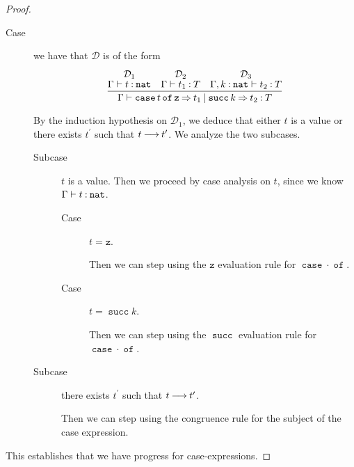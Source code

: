 \documentclass[11pt,letterpaper]{article}
\renewcommand{\succ}{\operatorname{\mathtt{succ}}}
\newcommand{\nat}{\mathtt{nat}}
\newcommand{\case}[1]{\operatorname{\mathtt{case}}#1\operatorname{\mathtt{of}}}
\begin{document}
\begin{enumerate}
\begin{proof}
      \begin{description}
        \item[Case] we have that $\mathcal{D}$ is of the form
          \begin{equation*}
            \infer{%
              \Gamma
              \proves
              \case{t} \mathtt{z} \goesto t_1
              \orcase \succ k \goesto t_2
              \hastype
              T
            }{
              \deduce[\mathcal{D}_1]{\Gamma \proves t \hastype \nat}{}
              &
              \deduce[\mathcal{D}_2]{\Gamma \proves t_1 \hastype T}{}
              &
              \deduce[\mathcal{D}_3]{
                \Gamma, k\hastype \nat \proves t_2 \hastype T
              }{}
            }
          \end{equation*}

          By the induction hypothesis on $\mathcal{D}_1$,
          we deduce that either $t$ is a value or there exists $t^\prime$ such
          that $t \mathbin{\longrightarrow} t^\prime$.
          We analyze the two subcases.
          \begin{description}
            \item[Subcase] $t$ is a value.
              Then we proceed by case analysis on $t$,
              since we know $\Gamma \proves t \hastype \nat$.
              \begin{description}
                \item[Case] $t = \mathtt{z}$.

                  Then we can step using the $\mathtt{z}$ evaluation rule for
                  $\case{\cdot}$.

                \item[Case] $t = \succ k$.

                  Then we can step using the $\succ$ evaluation rule for
                  $\case{\cdot}$.
              \end{description}

            \item[Subcase]
              there exists $t^\prime$ such that $t \mathbin{\longrightarrow} t^\prime$.

              Then we can step using the congruence rule for the subject of the
              case expression.
          \end{description}
      \end{description}

      This establishes that we have progress for case-expressions.
    \end{proof}
\end{enumerate}
\end{document}
